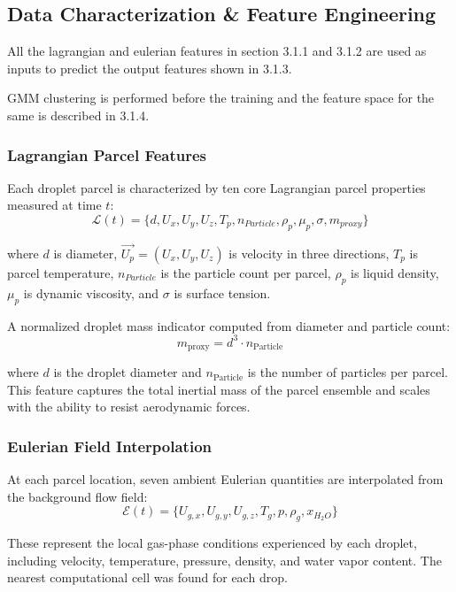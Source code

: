 \documentclass[letterpaper,twocolumn,10pt]{article}
\begin{document}
\subsection{Data Characterization \& Feature Engineering}
All the lagrangian and eulerian features in section 3.1.1 and 3.1.2 are used as inputs to predict the output features shown in 3.1.3.

GMM clustering is performed before the training and the feature space for the same is described in 3.1.4.
\subsubsection{Lagrangian Parcel Features}

Each droplet parcel is characterized by ten core Lagrangian parcel properties measured at time $t$:
\begin{equation}
\mathcal{L}(t) = \{d,U_{x}, U_{y}, U_{z}, T_p, n_{Particle}, \rho_p, \mu_p, \sigma, m_{proxy}\}
\end{equation}

where $d$ is diameter, $\vec{U_p}=(U_{x}, U_{y}, U_{z})$ is velocity in three directions, $T_p$ is parcel temperature, $n_{Particle}$ is the particle count per parcel, $\rho_p$ is liquid density, $\mu_p$ is dynamic viscosity, and $\sigma$ is surface tension.


A normalized droplet mass indicator computed from diameter and particle count:
\begin{equation}
m_{\text{proxy}} = d^3 \cdot n_{\text{Particle}}
\end{equation}

where $d$ is the droplet diameter and $n_{\text{Particle}}$ is the number of particles per parcel. This feature captures the total inertial mass of the parcel ensemble and scales with the ability to resist aerodynamic forces. 

\subsubsection{Eulerian Field Interpolation}

At each parcel location, seven ambient Eulerian quantities are interpolated from the background flow field:
\begin{equation}
\mathcal{E}(t) = \{U_{g,x}, U_{g,y}, U_{g,z}, T_g, p, \rho_g, x_{H_2O}\}
\end{equation}

These represent the local gas-phase conditions experienced by each droplet, including velocity, temperature, pressure, density, and water vapor content. The nearest computational cell was found for each drop.
\end{document}

